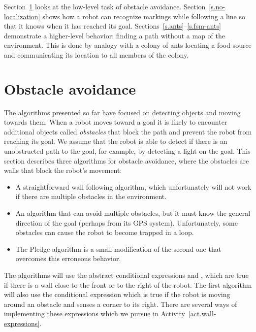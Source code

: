 Section~\ref{s.obstacle-avoidance} looks at the low-level task of obstacle avoidance. Section~\ref{s.no-localization} shows how a robot can recognize markings while following a line so that it knows when it has reached its goal. Sections~\ref{s.ants}--\ref{s.fsm-ants} demonstrate a higher-level behavior: finding a path without a map of the environment. This is done by analogy with a colony of ants locating a food source and communicating its location to all members of the colony.

\section{Obstacle avoidance}\label{s.obstacle-avoidance}

The algorithms presented so far have focused on detecting objects and moving towards them. When a robot moves toward a goal it is likely to encounter additional objects called \emph{obstacles} that block the path and prevent the robot from reaching its goal. We assume that the robot is able to detect if there is an unobstructed path to the goal, for example, by detecting a light on the goal. This section describes three algorithms for obstacle avoidance, where the obstacles are walls that block the robot's movement:
\begin{itemize}
\item A straightforward wall following algorithm, which unfortunately will not work if there are multiple obstacles in the environment.
\item An algorithm that can avoid multiple obstacles, but it must know the general direction of the goal (perhaps from its GPS system). Unfortunately, some obstacles can cause the robot to become trapped in a loop.
\item The Pledge algorithm is a small modification of the second one that overcomes this erroneous behavior.
\end{itemize}
The algorithms will use the abstract conditional expressions  and , which are true if there is a wall close to the front or to the right of the robot. The first algorithm will also use the conditional expression  which is true if the robot is moving around an obstacle and senses a corner to its right. There are several ways of implementing these expressions which we pursue in Activity~\ref{act.wall-expressions}.

